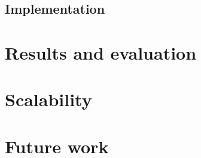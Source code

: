 \documentclass[11pt,a4paper]{article}
\begin{document}
\begin{multicols}{2}
\subsection{Implementation}


\label{evaluation}
\section{Results and evaluation}



\label{scalability}
\section{Scalability}



\label{futurework}
\section{Future work}


\end{multicols}
\end{document}
